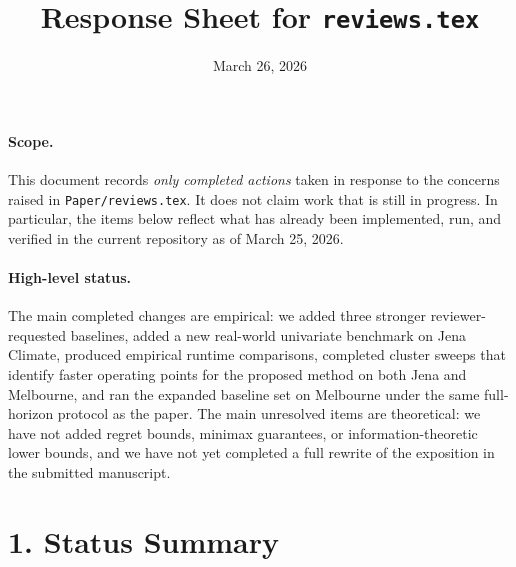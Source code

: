 \documentclass[11pt]{article}
\title{Response Sheet for \texttt{reviews.tex}}
\author{}
\date{March 26, 2026}
\begin{document}
\maketitle

\paragraph{Scope.}
This document records \emph{only completed actions} taken in response to the concerns raised in \texttt{Paper/reviews.tex}. It does not claim work that is still in progress. In particular, the items below reflect what has already been implemented, run, and verified in the current repository as of March 25, 2026.

\paragraph{High-level status.}
The main completed changes are empirical: we added three stronger reviewer-requested baselines, added a new real-world univariate benchmark on Jena Climate, produced empirical runtime comparisons, completed cluster sweeps that identify faster operating points for the proposed method on both Jena and Melbourne, and ran the expanded baseline set on Melbourne under the same full-horizon protocol as the paper. The main unresolved items are theoretical: we have not added regret bounds, minimax guarantees, or information-theoretic lower bounds, and we have not yet completed a full rewrite of the exposition in the submitted manuscript.

\section*{1. Status Summary}
\end{document}
